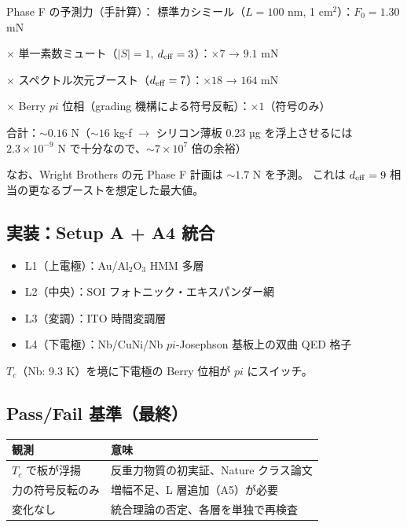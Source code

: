 \documentclass[11pt,a4paper]{article}
\def\pi{pi}%
\def\textbf#1{#1}%
\begin{document}
\begin{theorybox}
\textbf{Phase F の予測力（手計算）}：
標準カシミール（$L=100$ nm, 1 cm$^2$）：$F_0 = 1.30$ mN

$\times$ 単一素数ミュート（$|S|=1$, $d_{\rm eff}=3$）：$\times 7$ → $9.1$ mN

$\times$ スペクトル次元ブースト（$d_{\rm eff} = 7$）：$\times 18$ → $164$ mN

$\times$ Berry $\pi$ 位相（grading 機構による符号反転）：$\times 1$（符号のみ）

合計：$\sim 0.16$ N（$\sim 16$ kg-f $\to$ シリコン薄板 0.23 µg を浮上させるには
$2.3\times 10^{-9}$ N で十分なので、$\sim 7\times 10^7$ 倍の余裕）

\textbf{なお、Wright Brothers の元 Phase F 計画は $\sim 1.7$ N を予測}。
これは $d_{\rm eff} = 9$ 相当の更なるブーストを想定した最大値。
\end{theorybox}

\subsection{実装：Setup A + A4 統合}

\begin{itemize}
\item L1（上電極）：Au/Al$_2$O$_3$ HMM 多層
\item L2（中央）：SOI フォトニック・エキスパンダー網
\item L3（変調）：ITO 時間変調層
\item L4（下電極）：Nb/CuNi/Nb $\pi$-Josephson 基板上の双曲 QED 格子
\end{itemize}

$T_c$（Nb: 9.3 K）を境に下電極の Berry 位相が $\pi$ にスイッチ。

\subsection{Pass/Fail 基準（最終）}

\begin{center}
\begin{tabular}{p{}p{}}
\toprule
観測 & 意味 \\
\midrule
$T_c$ で板が浮揚 & \textbf{反重力物質の初実証、Nature クラス論文} \\
力の符号反転のみ & 増幅不足、L 層追加（A5）が必要 \\
変化なし & 統合理論の否定、各層を単独で再検査 \\
\bottomrule
\end{tabular}
\end{center}
\end{document}
